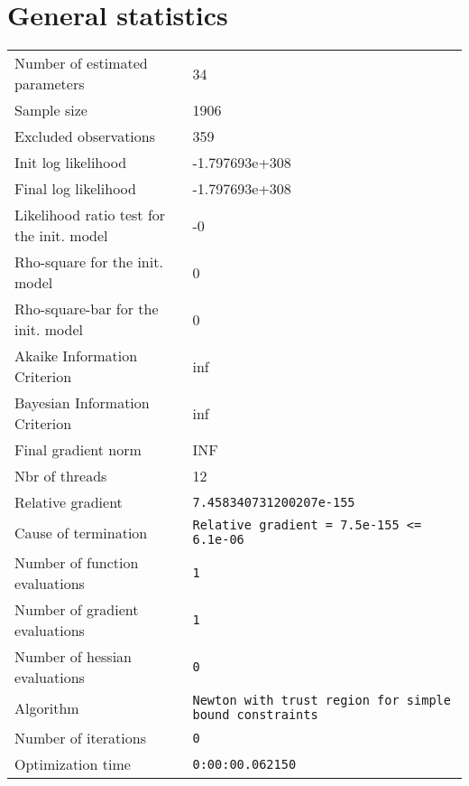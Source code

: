 



\section{General statistics}
\begin{tabular}{ll}
Number of estimated parameters & 34 \\
Sample size & 1906 \\
Excluded observations & 359 \\
Init log likelihood & -1.797693e+308 \\
Final log likelihood & -1.797693e+308 \\
Likelihood ratio test for the init. model & -0 \\
Rho-square for the init. model & 0 \\
Rho-square-bar for the init. model & 0 \\
Akaike Information Criterion & inf \\
Bayesian Information Criterion & inf \\
Final gradient norm & INF \\
Nbr of threads & 12 \\
Relative gradient & \verb$7.458340731200207e-155$ \\
Cause of termination & \verb$Relative gradient = 7.5e-155 <= 6.1e-06$ \\
Number of function evaluations & \verb$1$ \\
Number of gradient evaluations & \verb$1$ \\
Number of hessian evaluations & \verb$0$ \\
Algorithm & \verb$Newton with trust region for simple bound constraints$ \\
Number of iterations & \verb$0$ \\
Optimization time & \verb$0:00:00.062150$ \\
\end{tabular}

